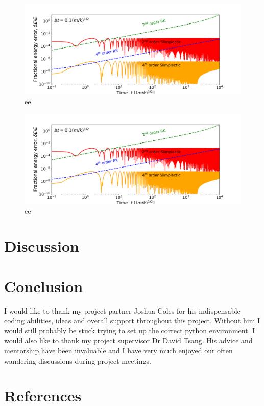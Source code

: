 \documentclass[10pt]{iopart}
\begin{document}
\begin{figure}
	\centering
	\label{model_comp}
	\includegraphics[width=\textwidth]{EnergyPlot.png}
	\caption{ee}
\end{figure}

\begin{figure}
	\centering
	\label{lossSlices}
	\includegraphics[width=\columnwidth]{EnergyPlot.png}
	\caption{ee}
\end{figure}

\section{Discussion}
\section{Conclusion}
\ack
I would like to thank my project partner Joshua Coles for his indispensable coding abilities, ideas and overall support throughout this project. Without him I would still probably be stuck trying to set up the correct python environment. I would also like to thank my project supervisor Dr David Tsang. His advice and mentorship have been invaluable and I have very much enjoyed our often wandering discussions during project meetings. 
\section*{References}


\end{document}
